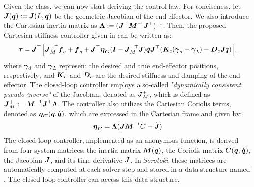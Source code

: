 Given the  class, we can now start deriving the control law. For conciseness, let ${\boldsymbol{J}}({\boldsymbol{q}}) := {\boldsymbol{J}}(L,{\boldsymbol{q}})$ be the geometric Jacobian of the end-effector. We also introduce the Cartesian inertia matrix as $\LambdaB := (\JB^\top \MB \inv \JB^\top)\inv$. Then, the proposed Cartesian stiffness controller given in \cite{DellaSantina2020a} can be written as:
%
\begin{multline}
    \boldsymbol{\tau} = {\boldsymbol{J}}^\top \Big[{\boldsymbol{J}}_M^{+\top} {\boldsymbol{f}}_{e} + {\boldsymbol{f}}_{g} + {\boldsymbol{J}}^\top {\boldsymbol{\eta}}_{{\boldsymbol{C}}}({\boldsymbol{I}} - {\boldsymbol{J}}_M^{+\top}{\boldsymbol{J}}){\dot{\boldsymbol{q}}}  {\boldsymbol{J}}^\top({\boldsymbol{K}}_{c} ({\boldsymbol{\gamma}}_d - {\boldsymbol{\gamma}}_L) - {\boldsymbol{D}}_c {\boldsymbol{J}} {\dot{\boldsymbol{q}}}) \Big ],
    \label{eq:C5:dellasantina_controller}
\end{multline}
%
where ${\boldsymbol{\gamma}}_d$ and ${\boldsymbol{\gamma}}_L$ represent the desired and true end-effector positions, respectively; and ${\boldsymbol{K}}_c$ and ${\boldsymbol{D}}_c$ are the desired stiffness and damping of the end-effector. The closed-loop controller employs a so-called \textit{"dynamically consistent pseudo-inverse"} of the Jacobian, denoted as ${\boldsymbol{J}}_M^{+}$, which is defined as ${\boldsymbol{J}}_M^{+} := {\boldsymbol{M}}^{-1} {\boldsymbol{J}}^\top \boldsymbol{\Lambda}$. The controller also utilizes the Cartesian Coriolis terms, denoted as ${\boldsymbol{\eta}}_{{\boldsymbol{C}}}({\boldsymbol{q}},{\dot{\boldsymbol{q}}})$, which are expressed in the Cartesian frame and given by:
%
\begin{equation}
    \etaB_{\CB} = \LambdaB (\JB \MB\inv \CB - \dot{\JB})
\end{equation}
%
The closed-loop controller, implemented as an anonymous function, is derived from four system matrices: the inertia matrix ${\boldsymbol{M}}({\boldsymbol{q}})$, the Coriolis matrix ${\boldsymbol{C}}({\boldsymbol{q}},{\dot{\boldsymbol{q}}})$, the Jacobian ${\boldsymbol{J}}$, and its time derivative $\dot{{\boldsymbol{J}}}$. In \textit{Sorotoki}, these matrices are automatically computed at each solver step and stored in a data structure named . The closed-loop controller can access this data structure. %


    


